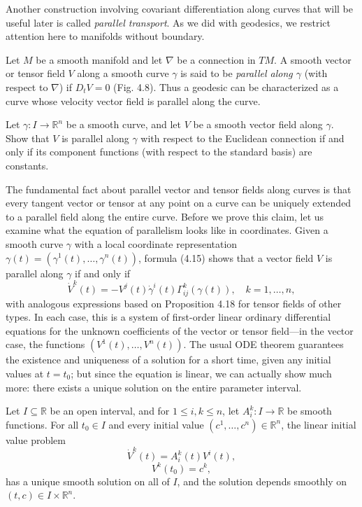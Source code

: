 Another construction involving covariant differentiation along curves that will be useful later is called \emph{parallel transport}. As we did with geodesics, we restrict attention here to manifolds without boundary.

Let $M$ be a smooth manifold and let $\nabla$ be a connection in $TM$. A smooth vector or tensor field $V$ along a smooth curve $\gamma$ is said to be \emph{parallel along $\gamma$} (with respect to $\nabla$) if $D_t V = 0$ (Fig. 4.8). Thus a geodesic can be characterized as a curve whose velocity vector field is parallel along the curve.

\begin{exercise}\label{exer:parallel-vector-field-euclidean-connection}
Let $\gamma : I \to \mathbb{R}^n$ be a smooth curve, and let $V$ be a smooth vector field along $\gamma$. Show that $V$ is parallel along $\gamma$ with respect to the Euclidean connection if and only if its component functions (with respect to the standard basis) are constants.
\end{exercise}

The fundamental fact about parallel vector and tensor fields along curves is that every tangent vector or tensor at any point on a curve can be uniquely extended to a parallel field along the entire curve. Before we prove this claim, let us examine what the equation of parallelism looks like in coordinates. Given a smooth curve $\gamma$ with a local coordinate representation $\gamma(t) = (\gamma^1(t), \ldots, \gamma^n(t))$, formula (4.15) shows that a vector field $V$ is parallel along $\gamma$ if and only if
\begin{equation}
\dot{V}^k(t) = -V^j(t) \dot{\gamma}^i(t) \Gamma^k_{ij}(\gamma(t)), \quad k = 1, \ldots, n,
\tag{4.19}
\end{equation}
with analogous expressions based on Proposition 4.18 for tensor fields of other types. In each case, this is a system of first-order linear ordinary differential equations for the unknown coefficients of the vector or tensor field---in the vector case, the functions $(V^1(t), \ldots, V^n(t))$. The usual ODE theorem guarantees the existence and uniqueness of a solution for a short time, given any initial values at $t = t_0$; but since the equation is linear, we can actually show much more: there exists a unique solution on the entire parameter interval.

\begin{theorem}\label{thm:linear-ode-existence-uniqueness}
Let $I \subseteq \mathbb{R}$ be an open interval, and for $1 \le i,k \le n$, let $A^k_i : I \to \mathbb{R}$ be smooth functions. For all $t_0 \in I$ and every initial value $(c^1, \ldots, c^n) \in \mathbb{R}^n$, the linear initial value problem
\begin{equation}
\dot{V}^k(t) = A^k_i(t) V^i(t),
\tag{4.20}
\end{equation}
\[
V^k(t_0) = c^k,
\]
has a unique smooth solution on all of $I$, and the solution depends smoothly on $(t, c) \in I \times \mathbb{R}^n$.
\end{theorem}

